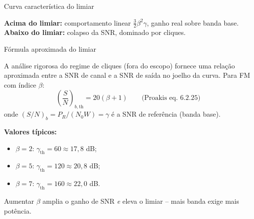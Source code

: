 
\begin{frame}{Curva característica do limiar}

\begin{center}
\end{center}

\textbf{Acima do limiar:} comportamento linear $\tfrac{3}{2}\beta^2 \gamma$, ganho real sobre banda base. \textbf{Abaixo do limiar:} colapso da SNR, dominado por cliques.

\end{frame}


\begin{frame}{Fórmula aproximada do limiar}

A análise rigorosa do regime de cliques (fora do escopo) fornece uma relação aproximada entre a SNR de canal e a SNR de saída no joelho da curva. Para FM com índice $\beta$:
\[
\boxed{\left(\frac{S}{N}\right)_{b,\text{th}} = 20(\beta + 1)}
\qquad \text{(Proakis eq.~6.2.25)}
\]
onde $(S/N)_b = P_R/(N_0 W) = \gamma$ é a SNR de referência (banda base).

\textbf{Valores típicos:}
\begin{itemize}
\item $\beta = 2$: $\gamma_{\text{th}} = 60 \approx 17{,}8$ dB;
\item $\beta = 5$: $\gamma_{\text{th}} = 120 \approx 20{,}8$ dB;
\item $\beta = 7$: $\gamma_{\text{th}} = 160 \approx 22{,}0$ dB.
\end{itemize}

Aumentar $\beta$ amplia o ganho de SNR \emph{e} eleva o limiar -- mais banda exige mais potência.

\end{frame}


